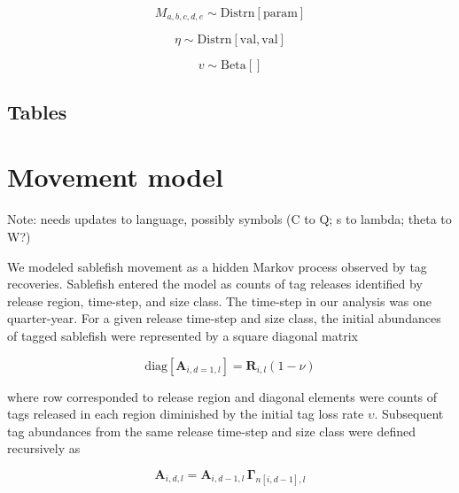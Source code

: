 \documentclass{article}
\begin{document}
\begin{equation}
  \label{eq:prior-mortality}
  M_{a,b,c,d,e}  \sim \mathrm{Distrn} \! \left[ \mathrm{param} \right]
\end{equation}

\begin{equation}
  \label{eq:prior-tagloss}
  \eta \sim \mathrm{Distrn} \! \left[ \mathrm{val, val} \right]
\end{equation}

\begin{equation}
  \label{eq:prior-initloss}
  v \sim \mathrm{Beta} \! \left[  \right]
\end{equation}


\subsection{Tables}




\section{Movement model}

\noindent Note: needs updates to language, possibly symbols (C to Q; s to lambda; theta to W?) 

We modeled sablefish movement as a hidden Markov process \cite[][]{langrock-2012-flexible-practical} observed by tag recoveries. Sablefish entered the model as counts of tag releases identified by release region, time-step, and size class. The time-step in our analysis was one quarter-year. For a given release time-step and size class, the initial abundances of tagged sablefish were represented by a square diagonal matrix 

\begin{equation}
  \label{eq:abundance-initial}
  \mathrm{diag} \! \left[\boldsymbol{A}_{i,d=1,l}\right] = \boldsymbol{R}_{i,l} \left(1 - \nu \right)
\end{equation}


where row corresponded to release region and diagonal elements were counts of tags released in each region diminished by the initial tag loss rate $\upsilon$. Subsequent tag abundances from the same release time-step and size class were defined recursively as 

\begin{equation}
    \label{eq:abundance}
    \boldsymbol{A}_{i,d,l} = \boldsymbol{A}_{i,d-1,l} \, \boldsymbol{\Gamma}_{n[i,d-1],l}
\end{equation}
\end{document}
